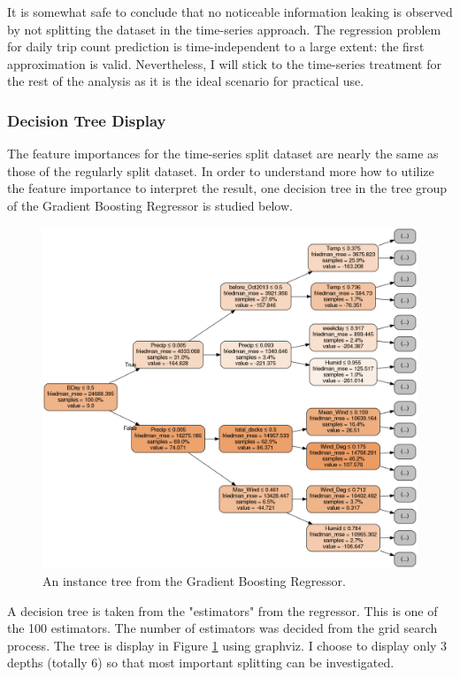 \documentclass[a4paper]{article}
\begin{document}
			It is somewhat safe to conclude that no noticeable information leaking is observed by not splitting the dataset in the time-series approach. The regression problem for daily trip count prediction is time-independent to a large extent: the first approximation is valid. Nevertheless, I will stick to the time-series treatment for the rest of the analysis as it is the ideal scenario for practical use.	
			
			\subsubsection{Decision Tree Display}			
			The feature importances for the time-series split dataset are nearly the same as those of the regularly split dataset. In order to understand more how to utilize the feature importance to interpret the result, one decision tree in the tree group of the Gradient Boosting Regressor is studied below.
			
			\begin{figure}
				\centering
				\includegraphics[width=1\textwidth]{sub_tree_16.png}				\caption{\label{fig:sub_tree_16}An instance tree from the Gradient Boosting Regressor.}	
			\end{figure}	
			
			A decision tree is taken from the "estimators" from the regressor. This is one of the 100 estimators. The number of estimators was decided from the grid search process. The tree is display in Figure \ref{fig:sub_tree_16} using graphviz. I choose to display only 3 depths (totally 6) so that most important splitting can be investigated. 
			
\end{document}
